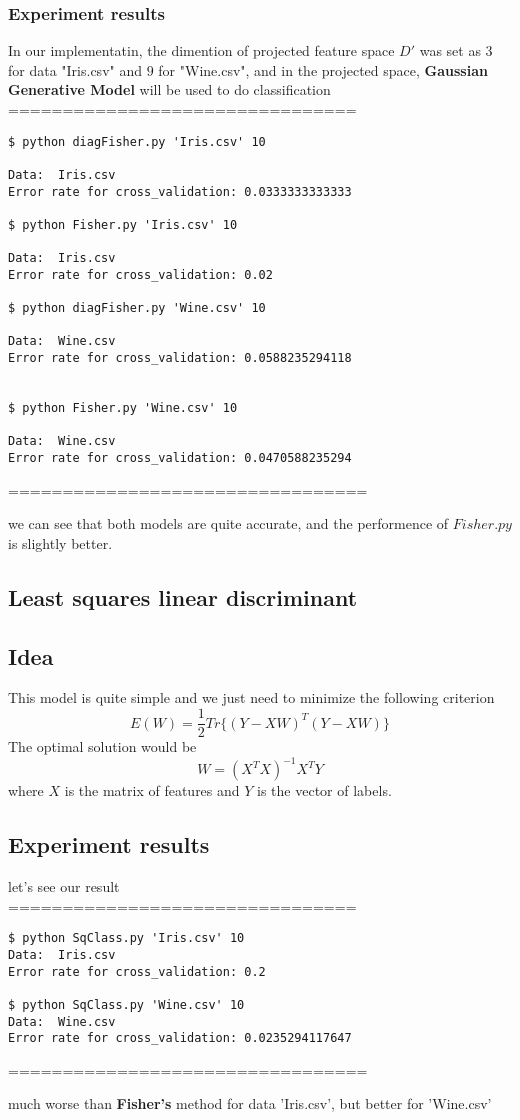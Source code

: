\documentclass[12pt]{amsart}
\begin{document}
\subsubsection*{Experiment results}
In our implementatin, the dimention of projected feature space $D'$ was set as $3$ for
data "Iris.csv" and $9$ for "Wine.csv", and in the projected space, \textbf{Gaussian Generative Model} will be used to do classification\\
================================


\begin{verbatim}
$ python diagFisher.py 'Iris.csv' 10

Data:  Iris.csv
Error rate for cross_validation: 0.0333333333333

$ python Fisher.py 'Iris.csv' 10

Data:  Iris.csv
Error rate for cross_validation: 0.02

$ python diagFisher.py 'Wine.csv' 10

Data:  Wine.csv
Error rate for cross_validation: 0.0588235294118


$ python Fisher.py 'Wine.csv' 10

Data:  Wine.csv
Error rate for cross_validation: 0.0470588235294
\end{verbatim}
=================================

we can see that both models are quite accurate, and the performence of $Fisher.py$ is 
slightly better.



\subsection*{Least squares linear discriminant}
\subsection*{Idea}
This model is quite simple and we just need to minimize the following criterion
$$
	E(W) = \frac{1}{2}Tr\big \{ (Y - XW)^T (Y-XW) \big \}
$$
The optimal solution would be
$$
	W = (X^TX)^{-1}X^TY
$$
where $X$ is the matrix of features and $Y$ is the vector of labels.

\subsection*{Experiment results}
let's see our result\\
================================
\begin{verbatim}
$ python SqClass.py 'Iris.csv' 10
Data:  Iris.csv
Error rate for cross_validation: 0.2

$ python SqClass.py 'Wine.csv' 10
Data:  Wine.csv
Error rate for cross_validation: 0.0235294117647
\end{verbatim}
=================================

much worse than \textbf{Fisher's} method for data 'Iris.csv', 
but better for 'Wine.csv'
\end{document}
